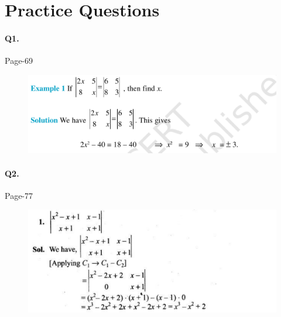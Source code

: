 \documentclass{article}
\begin{document}
\section*{Practice Questions}
\paragraph{Q1.}
\begin{flushright}
Page-69
\end{flushright}
\begin{figure}[H]
    \includegraphics[scale=0.5]{determinants_l1_ps_1.png}
\end{figure}
\paragraph{Q2.}
\begin{flushright}
Page-77
\end{flushright}
\begin{figure}[H]
    \includegraphics[scale=0.5]{determinants_l1_ps_2.png}
\end{figure}
\end{document}
